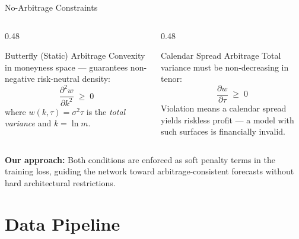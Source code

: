 \documentclass[aspectratio=169,10pt]{beamer}
\begin{document}
\begin{frame}{No-Arbitrage Constraints}
  \begin{columns}[T]
    \begin{column}{0.48\textwidth}
      \begin{block}{Butterfly (Static) Arbitrage}
        \small
        Convexity in moneyness space --- guarantees non-negative risk-neutral density:
        \[
          \frac{\partial^2 w}{\partial k^2} \;\ge\; 0
        \]
        where $w(k,\tau)=\sigma^2\tau$ is the \emph{total variance} and $k=\ln m$.
      \end{block}
    \end{column}
    \begin{column}{0.48\textwidth}
      \begin{block}{Calendar Spread Arbitrage}
        \small
        Total variance must be non-decreasing in tenor:
        \[
          \frac{\partial w}{\partial \tau} \;\ge\; 0
        \]
        Violation means a calendar spread yields riskless profit --- a model with such surfaces is financially invalid.
      \end{block}
    \end{column}
  \end{columns}
  \vspace{8pt}
  \small\textbf{Our approach:} Both conditions are enforced as \alert{soft penalty terms} in the training loss, guiding the network toward arbitrage-consistent forecasts without hard architectural restrictions.
\end{frame}

\section{Data Pipeline}
\end{document}
